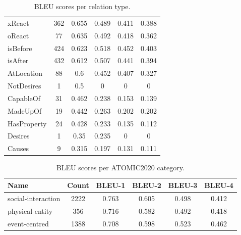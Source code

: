 \begin{table}[th]
\begin{tabular}{|l|c|c c c c|}
		xReact        & 362            & 0.655           & 0.489           & 0.411           & 0.388           \\
		oReact        & 77             & 0.635           & 0.492           & 0.418           & 0.362           \\
		isBefore      & 424            & 0.623           & 0.518           & 0.452           & 0.403           \\
		isAfter       & 432            & 0.612           & 0.507           & 0.441           & 0.394           \\
		AtLocation    & 88             & 0.6             & 0.452           & 0.407           & 0.327           \\
		NotDesires    & 1              & 0.5             & 0               & 0               & 0               \\
		CapableOf     & 31             & 0.462           & 0.238           & 0.153           & 0.139           \\
		MadeUpOf      & 19             & 0.442           & 0.263           & 0.202           & 0.202           \\
		HasProperty   & 24             & 0.428           & 0.233           & 0.135           & 0.112           \\
		Desires       & 1              & 0.35            & 0.235           & 0               & 0               \\
		Causes        & 9              & 0.315           & 0.197           & 0.131           & 0.111           \\
		\hline
	\end{tabular}

	\caption{BLEU scores per relation type.}
	\label{tab:bleu-relation}

\end{table}


\begin{table}[ht]
	\setlength{\tabcolsep}{7pt}

	\begin{tabular}{|l|c|c c c c|}
		\hline
		\textbf{Name}      & \textbf{Count} & \textbf{BLEU-1} & \textbf{BLEU-2} & \textbf{BLEU-3} & \textbf{BLEU-4} \\
		\hline
		social-interaction & 2222           & 0.763           & 0.605           & 0.498           & 0.412           \\
		physical-entity    & 356            & 0.716           & 0.582           & 0.492           & 0.418           \\
		event-centred      & 1388           & 0.708           & 0.598           & 0.523           & 0.462           \\
		\hline
	\end{tabular}

	\caption{BLEU scores per ATOMIC2020 category.}
	\label{tab:bleu-category}
\end{table}